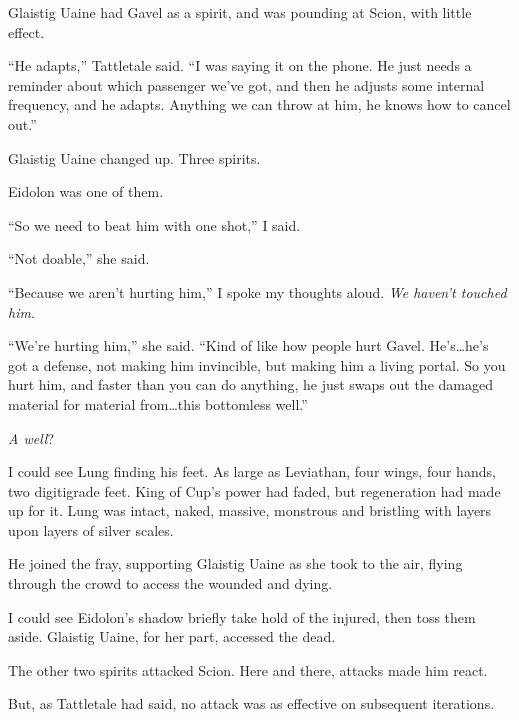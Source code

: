 Glaistig Uaine had Gavel as a spirit, and was pounding at Scion, with little effect.



``He adapts,'' Tattletale said.  ``I was saying it on the phone.  He just needs a reminder about which passenger we've got, and then he adjusts some internal frequency, and he adapts.  Anything we can throw at him, he knows how to cancel out.''



Glaistig Uaine changed up.  Three spirits.



Eidolon was one of them.



``So we need to beat him with one shot,'' I said.



``Not doable,'' she said.



``Because we aren't hurting him,'' I spoke my thoughts aloud.  \emph{We haven't touched him}.



``We're hurting him,'' she said.  ``Kind of like how people hurt Gavel.  He's\ldots he's got a defense, not making him invincible, but making him a living portal.  So you hurt him, and faster than you can do anything, he just swaps out the damaged material for material from\ldots this bottomless well.''



\emph{A well}?



I could see Lung finding his feet.  As large as Leviathan, four wings, four hands, two digitigrade feet.  King of Cup's power had faded, but regeneration had made up for it.  Lung was intact, naked, massive, monstrous and bristling with layers upon layers of silver scales.



He joined the fray, supporting Glaistig Uaine as she took to the air, flying through the crowd to access the wounded and dying.



I could see Eidolon's shadow briefly take hold of the injured, then toss them aside.  Glaistig Uaine, for her part, accessed the dead.



The other two spirits attacked Scion.  Here and there, attacks made him react.



But, as Tattletale had said, no attack was as effective on subsequent iterations.



